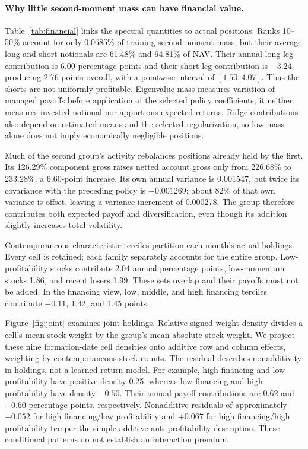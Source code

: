 \paragraph{Why little second-moment mass can have financial value.}
Table~\ref{tab:financial} links the spectral quantities to actual positions. Ranks 10--50\% account for only 0.0685\% of training second-moment mass, but their average long and short notionals are 61.48\% and 64.81\% of NAV. Their annual long-leg contribution is 6.00 percentage points and their short-leg contribution is $-3.24$, producing 2.76 points overall, with a pointwise interval of $[1.50,4.07]$. Thus the shorts are not uniformly profitable. Eigenvalue mass measures variation of managed payoffs before application of the selected policy coefficients; it neither measures invested notional nor apportions expected returns. Ridge contributions also depend on estimated means and the selected regularization, so low mass alone does not imply economically negligible positions.

Much of the second group's activity rebalances positions already held by the first. Its 126.29\% component gross raises netted account gross only from 226.68\% to 233.28\%, a 6.60-point increase. Its own annual variance is 0.001547, but twice its covariance with the preceding policy is $-0.001269$; about 82\% of that own variance is offset, leaving a variance increment of 0.000278. The group therefore contributes both expected payoff and diversification, even though its addition slightly increases total volatility.



Contemporaneous characteristic terciles partition each month's actual holdings. Every cell is retained; each family separately accounts for the entire group. Low-profitability stocks contribute 2.04 annual percentage points, low-momentum stocks 1.86, and recent losers 1.99. These sets overlap and their payoffs must not be added. In the financing view, low, middle, and high financing terciles contribute $-0.11$, 1.42, and 1.45 points.

Figure~\ref{fig:joint} examines joint holdings. Relative signed weight density divides a cell's mean stock weight by the group's mean absolute stock weight. We project these nine formation-date cell densities onto additive row and column effects, weighting by contemporaneous stock counts. The residual describes nonadditivity in holdings, not a learned return model. For example, high financing and low profitability have positive density 0.25, whereas low financing and high profitability have density $-0.50$. Their annual payoff contributions are 0.62 and $-0.60$ percentage points, respectively. Nonadditive residuals of approximately $-0.052$ for high financing/low profitability and $+0.067$ for high financing/high profitability temper the simple additive anti-profitability description. These conditional patterns do not establish an interaction premium.

